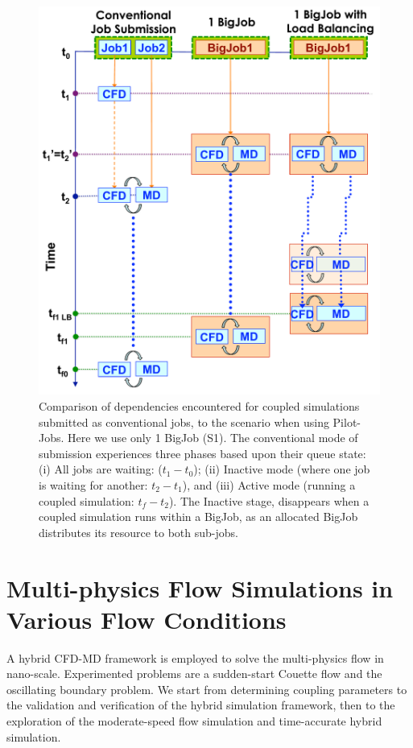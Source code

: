 \documentclass[preprint,12pt]{elsarticle}
\begin{document}
\begin{figure}
\centering
\includegraphics[width=0.8\linewidth]{Single_BigJob_Scenarios_new.pdf}
\caption{\small Comparison of dependencies encountered for coupled
  simulations submitted as conventional jobs, to the scenario when
  using Pilot-Jobs. Here we use only 1 BigJob (S1). The conventional
  mode of submission experiences three phases based upon their queue
  state: (i) All jobs are waiting: ($t_1-t_0$); (ii) Inactive mode
  (where one job is waiting for another: $t_2-t_1$), and (iii) Active
  mode (running a coupled simulation: $t_f-t_2$). The Inactive stage,
  disappears when a coupled simulation runs within a BigJob, as an
  allocated BigJob distributes its resource to both sub-jobs.}
\label{Fig:OneBJ_Flow}
\vspace{-1em}
\end{figure}



\section{Multi-physics Flow Simulations in Various Flow Conditions}
\label{sec:accuracy}
A hybrid CFD-MD framework is employed to solve the multi-physics flow in nano-scale. Experimented problems are a sudden-start Couette flow and the oscillating boundary problem. We start from determining coupling parameters to the validation and verification of the hybrid simulation framework, then to the exploration of the moderate-speed flow simulation and time-accurate hybrid simulation.
\end{document}
